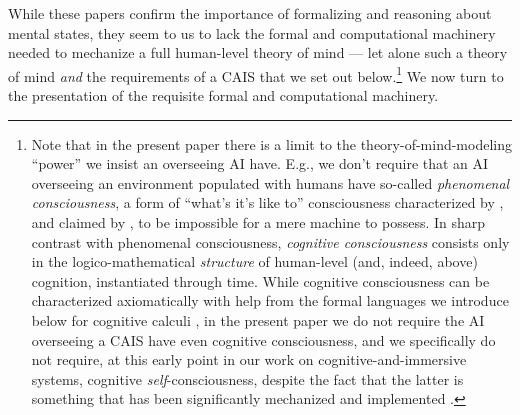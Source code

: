 While these papers confirm the importance of formalizing and reasoning
about mental states, they seem to us to lack the formal and
computational machinery needed to mechanize a full human-level theory
of mind --- let alone such a theory of mind \emph{and} the
requirements of a CAIS that we set out below.\footnote{Note that in
  the present paper there is a limit to the theory-of-mind-modeling
  ``power'' we insist an overseeing AI have.  E.g., we don't require
  that an AI overseeing an environment populated with humans have
  so-called \textit{phenomenal consciousness}, a form of ``what's it's
  like to'' consciousness characterized by \cite{bbs.block}, and
  claimed by \cite{sb_billion_conscious_robot}, to be impossible for a
  mere machine to possess.  In sharp contrast with phenomenal
  consciousness, \textit{cognitive consciousness} consists only in the
  logico-mathematical \emph{structure} of human-level (and, indeed,
  above) cognition, instantiated through time.  While cognitive
  consciousness can be characterized axiomatically with help from the
  formal languages we introduce below for cognitive calculi
  \cite{axiomatizing_consciousness1}, in the present paper we do not
  require the AI overseeing a CAIS have even cognitive consciousness,
  and we specifically do not require, at this early point in our work
  on cognitive-and-immersive systems, cognitive
  \emph{self}-consciousness, despite the fact that the latter is
  something that has been significantly mechanized and implemented
  \cite{roman2015_robot_self-con,sb_on_knowledge_game}.}  We now turn
to the presentation of the requisite formal and computational
machinery.
